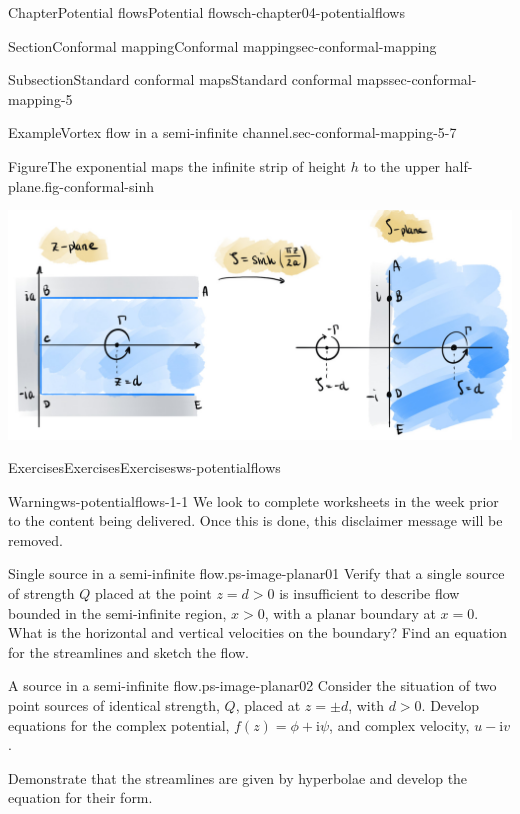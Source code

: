 \documentclass[oneside,10pt,]{book}
\numberwithin{equation}{section}
\newcommand{\im}{\mathrm{i}}
\newcommand{\gt}{>}
\begin{document}
\begin{chapterptx}{Chapter}{Potential flows}{}{Potential flows}{}{}{ch-chapter04-potentialflows}
\begin{sectionptx}{Section}{Conformal mapping}{}{Conformal mapping}{}{}{sec-conformal-mapping}
\begin{subsectionptx}{Subsection}{Standard conformal maps}{}{Standard conformal maps}{}{}{sec-conformal-mapping-5}
\begin{example}{Example}{Vortex flow in a semi-infinite channel.}{sec-conformal-mapping-5-7}
\begin{figureptx}{Figure}{The exponential maps the infinite strip of height \(h\) to the upper half-plane.}{fig-conformal-sinh}{}
\begin{image}{0}{1}{0}{}
\includegraphics[width=\linewidth]{external/conformal_sinh.jpg}
\end{image}%
\tcblower
\end{figureptx}%
\end{example}
\end{subsectionptx}
\end{sectionptx}
%
%
\typeout{************************************************}
\typeout{************************************************}
%
\begin{exercises-section}{Exercises}{Exercises}{}{Exercises}{}{}{ws-potentialflows}
\begin{introduction}{}%
\begin{warning}{Warning}{}{ws-potentialflows-1-1}%
We look to complete worksheets in the week prior to the content being delivered. Once this is done, this disclaimer message will be removed.%
\end{warning}
\end{introduction}%
\begin{divisionexercise}{1}{Single source in a semi-infinite flow.}{}{ps-image-planar01}%
Verify that a single source of strength \(Q\) placed at the point \(z = d > 0\) is insufficient to describe flow bounded in the semi-infinite region, \(x > 0\), with a planar boundary at \(x = 0\). What is the horizontal and vertical velocities on the boundary? Find an equation for the streamlines and sketch the flow.%
\end{divisionexercise}%
\begin{divisionexercise}{2}{A source in a semi-infinite flow.}{}{ps-image-planar02}%
Consider the situation of two point sources of identical strength, \(Q\), placed at \(z = \pm d\), with \(d \gt 0\). Develop equations for the complex potential, \(f(z) = \phi + \im \psi\), and complex velocity, \(u - \im v\).%
\par
Demonstrate that the streamlines are given by hyperbolae and develop the equation for their form.%

\end{divisionexercise}
\end{exercises-section}
\end{chapterptx}
\end{document}
